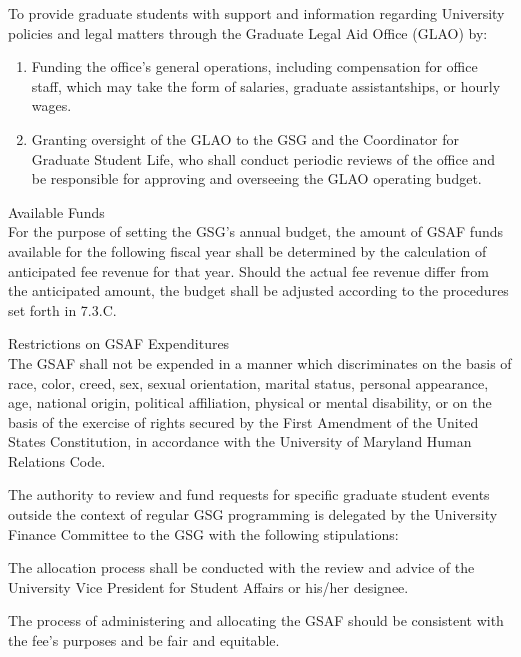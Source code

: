 \begin{bylaws-number}
\begin{bylaws-number}
\begin{enumerate}[i]
    \end{enumerate}
    \item To provide graduate students with support and information regarding University policies and legal matters through the Graduate Legal Aid Office (GLAO) by:
    \begin{enumerate}[i]
      \item Funding the office’s general operations, including compensation for office staff, which may take the form of salaries, graduate assistantships, or hourly wages.
      \item Granting oversight of the GLAO to the GSG and the Coordinator for Graduate Student Life, who shall conduct periodic reviews of the office and be responsible for approving and overseeing the GLAO operating budget.
    \end{enumerate}
  \end{bylaws-number}
  \item Available Funds \hfill \\
  For the purpose of setting the GSG’s annual budget, the amount of GSAF funds available for the following fiscal year shall be determined by the calculation of anticipated fee revenue for that year. Should the actual fee revenue differ from the anticipated amount, the budget shall be adjusted according to the procedures set forth in 7.3.C.
  \item Restrictions on GSAF Expenditures \hfill \\
  The GSAF shall not be expended in a manner which discriminates on the basis of race, color, creed, sex, sexual orientation, marital status, personal appearance, age, national origin, political affiliation, physical or mental disability, or on the basis of the exercise of rights secured by the First Amendment of the United States Constitution, in accordance with the University of Maryland Human Relations Code.
  \item The authority to review and fund requests for specific graduate student events outside the context of regular GSG programming is delegated by the University Finance Committee to the GSG with the following stipulations:
  \begin{bylaws-number}
    \item The allocation process shall be conducted with the review and advice of the University Vice President for Student Affairs or his/her designee.
    \item The process of administering and allocating the GSAF should be consistent with the fee’s purposes and be fair and equitable.

\end{bylaws-number}
\end{bylaws-number}
